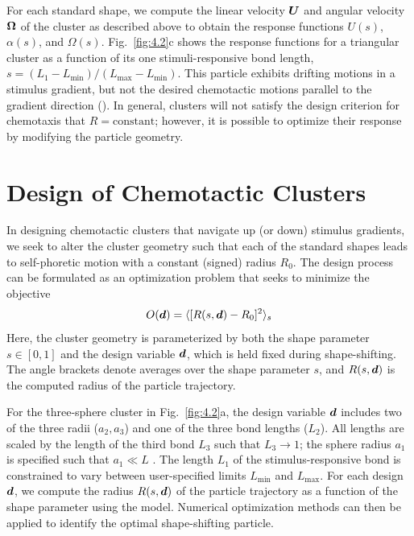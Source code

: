 For each standard shape, we compute the linear velocity $\boldsymbol{U}$ and angular velocity $\boldsymbol{\Omega}$ of the cluster as described above to obtain the response functions $U(s)$, $\alpha(s)$, and $\Omega(s)$. Fig.\ \ref{fig:4.2}c shows the response functions for a triangular cluster as a function of its one stimuli-responsive bond length, $s = (L_1 - L_{\min})/(L_{\max}-L_{\min})$.  This particle exhibits drifting motions in a stimulus gradient, but not the desired chemotactic motions parallel to the gradient direction ().  In general, clusters will not satisfy the design criterion for chemotaxis that $R=\text{constant}$; however, it is possible to optimize their response by modifying the particle geometry.

\section{Design of Chemotactic Clusters} In designing chemotactic clusters that navigate up (or down) stimulus gradients, we seek to alter the cluster geometry such that each of the standard shapes leads to self-phoretic motion with a constant (signed) radius $R_0$. The design process can be formulated as an optimization problem that seeks to minimize the objective
\begin{equation}
    O(\boldsymbol{d}) = \langle [R(s,\boldsymbol{d})-R_0]^2 \rangle_s
\end{equation}
Here, the cluster geometry is parameterized by both the shape parameter $s\in[0,1]$ and the design variable $\boldsymbol{d}$, which is held fixed during shape-shifting.  The angle brackets denote averages over the shape parameter $s$, and $R(s,\boldsymbol{d})$ is the computed radius of the particle trajectory.

For the three-sphere cluster in Fig.\ \ref{fig:4.2}a, the design variable $\boldsymbol{d}$ includes two of the three radii ($a_2,a_3$) and one of the three bond lengths ($L_2$). All lengths are scaled by the length of the third bond $L_3$ such that $L_3\rightarrow 1$; the sphere radius $a_1$ is specified such that $a_1\ll L$ . The length $L_1$ of the stimulus-responsive bond is constrained to vary between user-specified limits $L_{\min}$ and $L_{\max}$. For each design $\boldsymbol{d}$, we compute the radius $R(s,\boldsymbol{d})$ of the particle trajectory as a function of the shape parameter using the model.  Numerical optimization methods can then be applied to identify the optimal shape-shifting particle.

